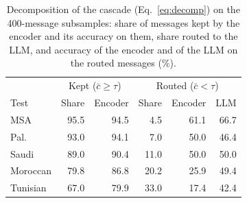 \begin{table}[t]\centering\small\caption{Decomposition of the cascade (Eq.~\eqref{eq:decomp}) on the 400-message subsamples: share of messages kept by the encoder and its accuracy on them, share routed to the LLM, and accuracy of the encoder and of the LLM on the routed messages (\%).}\label{tab:decomp}
\begin{tabular}{lrrrrr}\toprule
& \multicolumn{2}{c}{Kept ($\bar{c}\ge\tau$)} & \multicolumn{3}{c}{Routed ($\bar{c}<\tau$)}\\
Test & Share & Encoder & Share & Encoder & LLM \\\midrule
MSA & 95.5 & 94.5 & 4.5 & 61.1 & 66.7 \\
Pal. & 93.0 & 94.1 & 7.0 & 50.0 & 46.4 \\
Saudi & 89.0 & 90.4 & 11.0 & 50.0 & 50.0 \\
Moroccan & 79.8 & 86.8 & 20.2 & 25.9 & 49.4 \\
Tunisian & 67.0 & 79.9 & 33.0 & 17.4 & 42.4 \\
\bottomrule\end{tabular}\end{table}
